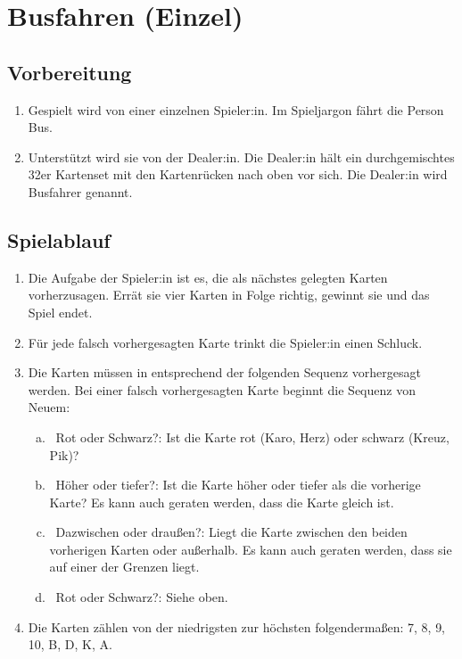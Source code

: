 \chapter{Busfahren (Einzel)}\label{Busfahren_solo}
\section{Vorbereitung}
\begin{enumerate}[label={(\arabic*)}]
    \item
    Gespielt wird von einer einzelnen Spieler:in.
    Im Spieljargon \glqq{}fährt die Person Bus\grqq{}.

    \item
    Unterstützt wird sie von der Dealer:in.
    Die Dealer:in hält ein durchgemischtes 32er Kartenset mit den Kartenrücken nach oben vor sich.
    Die Dealer:in wird \glqq{}Busfahrer\grqq{} genannt.
\end{enumerate}

\section{Spielablauf}
\begin{enumerate}[label={(\arabic*)}]
    \item
    Die Aufgabe der Spieler:in ist es, die als nächstes gelegten Karten vorherzusagen.
    Errät sie vier Karten in Folge richtig, gewinnt sie und das Spiel endet.
    
    \item
    Für jede falsch vorhergesagten Karte trinkt die Spieler:in einen Schluck.
    
    \item
    Die Karten müssen in entsprechend der folgenden Sequenz vorhergesagt werden.
    Bei einer falsch vorhergesagten Karte beginnt die Sequenz von Neuem:

    \begin{enumerate}[a.]
        \item\label{Busfahren_solo:Spielablauf:Fragen:RS}
~\glqq{}Rot oder Schwarz?\grqq{}:
        Ist die Karte rot (Karo, Herz) oder schwarz (Kreuz, Pik)?
        \item
~\glqq{}Höher oder tiefer?\grqq{}:
        Ist die Karte höher oder tiefer als die vorherige Karte?
        Es kann auch geraten werden, dass die Karte gleich ist.
        \item
~\glqq{}Dazwischen oder draußen?\grqq{}:
        Liegt die Karte zwischen den beiden vorherigen Karten oder außerhalb.
        Es kann auch geraten werden, dass sie auf einer der Grenzen liegt.
        \item
~\glqq{}Rot oder Schwarz?\grqq{}:
        Siehe oben.
    \end{enumerate}

    \item
    Die Karten zählen von der niedrigsten zur höchsten folgendermaßen: 7, 8, 9, 10, B, D, K, A.
\end{enumerate}
